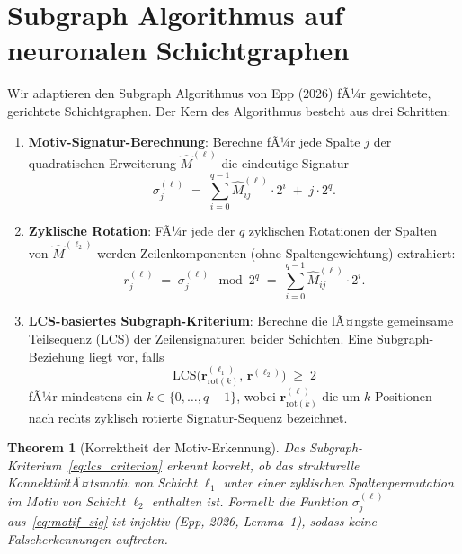 ﻿\documentclass[12pt, a4paper, openany]{report}
\newtheorem{theorem}{Theorem}[chapter]
\begin{document}
\section{Subgraph Algorithmus auf neuronalen Schichtgraphen}
\label{sec:sgkr_algo}

Wir adaptieren den Subgraph Algorithmus von Epp (2026) fÃ¼r gewichtete,
gerichtete Schichtgraphen.  Der Kern des Algorithmus besteht aus drei
Schritten:

\begin{enumerate}[label=(\Roman*)]
  \item \textbf{Motiv-Signatur-Berechnung}: Berechne fÃ¼r jede Spalte $j$
    der quadratischen Erweiterung $\hat{M}^{(\ell)}$ die eindeutige
    Signatur
    \begin{equation}
      \label{eq:motif_sig}
      \sigma_j^{(\ell)}
      \;=\;
      \sum_{i=0}^{q-1} \hat{M}^{(\ell)}_{ij} \cdot 2^i
      \;+\; j \cdot 2^q.
    \end{equation}
  \item \textbf{Zyklische Rotation}: FÃ¼r jede der $q$ zyklischen
    Rotationen der Spalten von $\hat{M}^{(\ell_2)}$ werden
    Zeilenkomponenten (ohne Spalten\-gewichtung) extrahiert:
    \begin{equation}
      \label{eq:row_sig}
      r_j^{(\ell)}
      \;=\; \sigma_j^{(\ell)} \!\!\mod 2^q
      \;=\; \sum_{i=0}^{q-1} \hat{M}^{(\ell)}_{ij} \cdot 2^i.
    \end{equation}
  \item \textbf{LCS-basiertes Subgraph-Kriterium}: Berechne die
    lÃ¤ngste gemeinsame Teilsequenz (LCS) der Zeilen\-signaturen beider
    Schichten.  Eine Subgraph-Beziehung liegt vor, falls
    \begin{equation}
      \label{eq:lcs_criterion}
      \mathrm{LCS}\!\bigl(\bm{r}^{(\ell_1)}_{\mathrm{rot}(k)},\,
                          \bm{r}^{(\ell_2)}\bigr)
      \;\geq\; 2
    \end{equation}
    fÃ¼r mindestens ein $k \in \{0,\ldots,q-1\}$, wobei
    $\bm{r}^{(\ell)}_{\mathrm{rot}(k)}$ die um $k$ Positionen nach rechts
    zyklisch rotierte Signatur-Sequenz bezeichnet.
\end{enumerate}

\begin{theorem}[Korrektheit der Motiv-Erkennung]
\label{thm:motif_correctness}
Das Subgraph-Kriterium~\eqref{eq:lcs_criterion} erkennt korrekt, ob das
strukturelle KonnektivitÃ¤tsmotiv von Schicht $\ell_1$ unter einer zyklischen
Spaltenpermutation im Motiv von Schicht $\ell_2$ enthalten ist.  Formell: die
Funktion $\sigma_j^{(\ell)}$ aus~\eqref{eq:motif_sig} ist injektiv (Epp, 2026,
Lemma~1), sodass keine Falscherkennungen auftreten.
\end{theorem}
\end{document}
